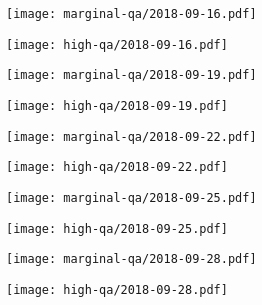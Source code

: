 \documentclass{article}
\begin{document}
\begin{figure}[H]
	\ContinuedFloat
	\centering
	\begin{subfigure}{0.48\linewidth}
		\texttt{[image: marginal-qa/2018-09-16.pdf]}
	\end{subfigure}
	\begin{subfigure}{0.48\linewidth}
		\texttt{[image: high-qa/2018-09-16.pdf]}
	\end{subfigure}
	\begin{subfigure}{0.48\linewidth}
		\texttt{[image: marginal-qa/2018-09-19.pdf]}
	\end{subfigure}
	\begin{subfigure}{0.48\linewidth}
		\texttt{[image: high-qa/2018-09-19.pdf]}
	\end{subfigure}
	\begin{subfigure}{0.48\linewidth}
		\texttt{[image: marginal-qa/2018-09-22.pdf]}
	\end{subfigure}
	\begin{subfigure}{0.48\linewidth}
		\texttt{[image: high-qa/2018-09-22.pdf]}
	\end{subfigure}
	\begin{subfigure}{0.48\linewidth}
		\texttt{[image: marginal-qa/2018-09-25.pdf]}
	\end{subfigure}
	\begin{subfigure}{0.48\linewidth}
		\texttt{[image: high-qa/2018-09-25.pdf]}
	\end{subfigure}
	\begin{subfigure}{0.48\linewidth}
		\texttt{[image: marginal-qa/2018-09-28.pdf]}
	\end{subfigure}
	\begin{subfigure}{0.48\linewidth}
		\texttt{[image: high-qa/2018-09-28.pdf]}
	\end{subfigure}
\end{figure}
\end{document}
